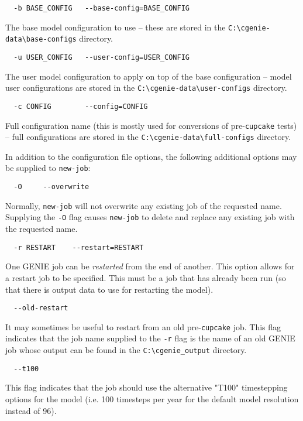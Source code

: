 \documentclass[a4paper,10pt,article]{memoir}
\begin{document}
\begin{verbatim}
  -b BASE_CONFIG   --base-config=BASE_CONFIG
\end{verbatim}
The base model configuration to use -- these are stored in the
\texttt{C:\textbackslash{}cgenie-data\textbackslash{}base-configs} directory.

\begin{verbatim}
  -u USER_CONFIG   --user-config=USER_CONFIG
\end{verbatim}
The user model configuration to apply on top of the base configuration
-- model user configurations are stored in the
\texttt{C:\textbackslash{}cgenie-data\textbackslash{}user-configs}
directory.

\begin{verbatim}
  -c CONFIG        --config=CONFIG
\end{verbatim}
Full configuration name (this is mostly used for conversions of
pre-\texttt{cupcake} tests) -- full configurations are stored in the
\texttt{C:\textbackslash{}cgenie-data\textbackslash{}full-configs}
directory.

In addition to the configuration file options, the following
additional options may be supplied to \texttt{new-job}:

\begin{verbatim}
  -O     --overwrite
\end{verbatim}
Normally, \texttt{new-job} will not overwrite any existing job of the
requested name.  Supplying the \texttt{-O} flag causes
\texttt{new-job} to delete and replace any existing job with the
requested name.

\begin{verbatim}
  -r RESTART    --restart=RESTART
\end{verbatim}
One GENIE job can be \emph{restarted} from the end of another.  This
option allows for a restart job to be specified.  This must be a job
that has already been run (so that there is output data to use for
restarting the model).

\begin{verbatim}
  --old-restart
\end{verbatim}
It may sometimes be useful to restart from an old pre-\texttt{cupcake}
job.  This flag indicates that the job name supplied to the
\texttt{-r} flag is the name of an old GENIE job whose output can be
found in the \texttt{C:\textbackslash{}cgenie\_output} directory.

\begin{verbatim}
  --t100
\end{verbatim}
This flag indicates that the job should use the alternative "T100"
timestepping options for the model (i.e. 100 timesteps per year for
the default model resolution instead of 96).
\end{document}
